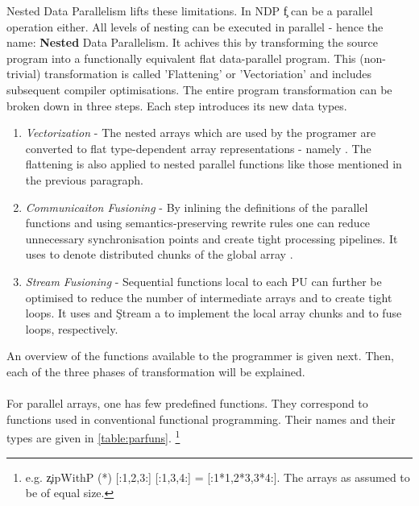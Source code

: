     Nested Data Parallelism lifts these limitations.
    In NDP \c{f} can be a parallel operation either. All levels of nesting can
    be executed in parallel - hence the name: \textbf{Nested} Data Parallelism.
    It achives this by transforming the source program into a functionally
    equivalent flat data-parallel program. This (non-trivial) transformation
    is called 'Flattening' or 'Vectoriation' and includes subsequent compiler optimisations.
    The entire program transformation can be broken down in three steps.
    Each step introduces its new data types.
    \begin{enumerate}
      \item \emph{Vectorization} -
        The nested arrays \pan{} which are used by the programer
        are converted to flat type-dependent array representations - namely  \pav{}.
        The flattening is also applied to nested parallel functions like
        those mentioned in the previous paragraph.
      \item \emph{Communicaiton Fusioning} -
        By inlining the definitions of the parallel functions and
        using semantics-preserving rewrite rules one can
        reduce unnecessary synchronisation points and
        create tight processing pipelines. It uses \pad{} to denote
        distributed chunks of the global array \pav{}.
      \item \emph{Stream Fusioning} -
        Sequential functions local to each PU can further
        be optimised to reduce the number of intermediate arrays
        and to create tight loops.
        It uses  and \c{Stream a} to
        implement the local array chunks and to fuse loops, respectively.
    \end{enumerate}
    
  An overview of the functions available to the programmer is given next.
  Then, each of the three phases of transformation will be explained.
  
  \paragraph{}
    For parallel arrays, one has few predefined functions.
    They correspond to functions used in conventional functional programming.
    Their names and their types are given in \ref{table:parfuns}.
    \footnote{e.g. \c{zipWithP (*) [:1,2,3:] [:1,3,4:] = [:1*1,2*3,3*4:]}. The arrays as assumed to be of equal size.}
    
